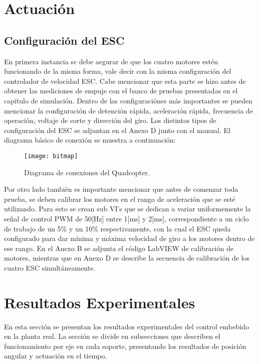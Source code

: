 \documentclass[../main.tex]{subfiles}
\begin{document}
\section{Actuación}


\subsection{Configuración del ESC}

En primera instancia se debe aegurar de que los cuatro motores estén
funcionando de la misma forma, vale decir con la misma configuración
del controlador de velocidad ESC. Cabe mencionar que esta parte se
hizo antes de obtener las mediciones de empuje con el banco de pruebas
presentadas en el capítulo de simulación. Dentro de las configuraciónes
más importantes se pueden mencionar la configuración de detención
rápida, aceleración rápida, frecuencia de operación, voltaje de corte
y dirección del giro. Los distintos tipos de configuración del ESC
se adjuntan en el Anexo D junto con el manual. El diagrama
básico de conexión se muestra a continuación:

\begin{figure}[H]
\noindent \begin{centering}
\texttt{[image: bitmap]}
\par\end{centering}
\caption{Diagrama de conexiones del Quadcopter.}
\end{figure}

Por otro lado también es importante mencionar que antes de comenzar
toda prueba, se deben calibrar los motores en el rango de aceleración
que se esté utilizando. Para esto se crean sub VI's que se dedican
a variar uniformemente la señal de control PWM de 50{[}Hz{]} entre
1{[}ms{]} y 2{[}ms{]}, correspondiente a un ciclo de trabajo de un
5\% y un 10\% respectivamente, con la cual el ESC queda configurado
para dar mínima y máxima velocidad de giro a los motores dentro de
ese rango. En el Anexo B se adjunta el código LabVIEW de calibración de motores, mientras que en Anexo D se describe la secuencia de calibración de los cuatro ESC simultáneamente. 

\section{Resultados Experimentales}

En esta sección se presentan los resultados experimentales del control
embebido en la planta real. La sección se divide en subsecciones que
describen el funcionamiento por eje en cada soporte, presentando los
resultados de posición angular y actuación en el tiempo. 
\end{document}
